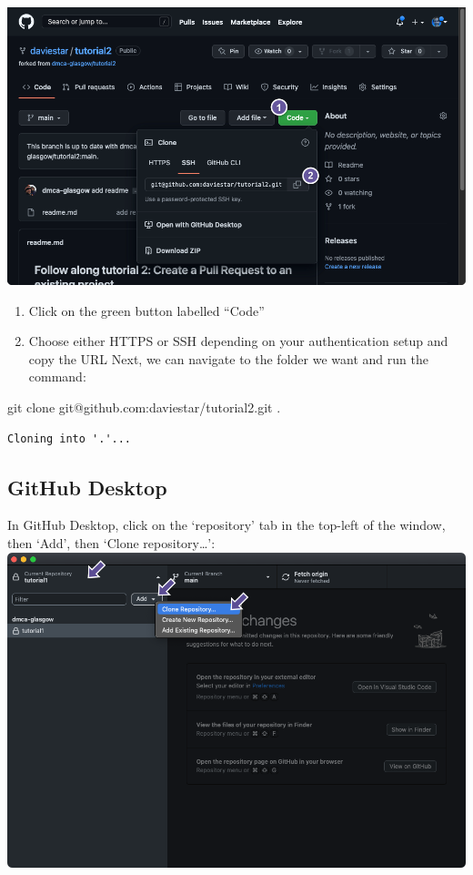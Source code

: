 \documentclass[
  letterpaper,
  DIV=11,
  numbers=noendperiod]{scrartcl}
\newenvironment{Shaded}{\begin{snugshade}}{\end{snugshade}}
\newcommand{\FunctionTok}[1]{\textcolor[rgb]{0.28,0.35,0.67}{#1}}
\newcommand{\NormalTok}[1]{\textcolor[rgb]{0.00,0.23,0.31}{#1}}
\providecommand{\tightlist}{%
  \setlength{\itemsep}{0pt}\setlength{\parskip}{0pt}}\usepackage{longtable,booktabs,array}
\begin{document}
\includegraphics{images/image80_1.png}

\begin{enumerate}
\def\labelenumi{\arabic{enumi}.}
\tightlist
\item
  Click on the green button labelled ``Code''
\item
  Choose either HTTPS or SSH depending on your authentication setup and
  copy the URL Next, we can navigate to the folder we want and run the
  command:
\end{enumerate}

\begin{Shaded}
\begin{Highlighting}[]
\FunctionTok{git}\NormalTok{ clone git@github.com:daviestar/tutorial2.git .}
\end{Highlighting}
\end{Shaded}

\begin{verbatim}
Cloning into '.'...
\end{verbatim}

\subsection{GitHub Desktop}

In GitHub Desktop, click on the `repository' tab in the top-left of the
window, then `Add', then `Clone repository\ldots{}':
\includegraphics{images/image80.png}
\end{document}
